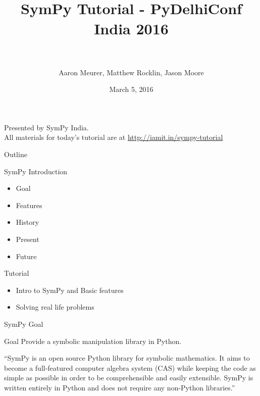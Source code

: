 \documentclass[xcolor=svgnames]{beamer}
\title[SymPy\hspace{4em}\insertframenumber/
  \inserttotalframenumber]{~\\ SymPy Tutorial - PyDelhiConf India 2016\\~}
\author[A. Meurer, Matthew Rocklin, Jason Moore]
  {Aaron Meurer, Matthew Rocklin, Jason Moore}
\institute{\pgfuseimage{mylogo}}
\date{March 5, 2016}
\begin{document}
  \begin{frame}
    \maketitle
  \begin{center}
  \normalsize Presented by SymPy India.\\ All materials for today's tutorial are at \url{http://iamit.in/sympy-tutorial}
  \end{center}
  \end{frame}
  
  \begin{frame}{Outline}
    \begin{block}{SymPy Introduction}
      \begin{itemize}
      \item Goal
      \item Features
      \item History
      \item Present
      \item Future
      \end{itemize}
    \end{block}

    \begin{block}{Tutorial}
      \begin{itemize}
      \item Intro to SymPy and Basic features
      \item Solving real life problems
      \end{itemize}
    \end{block}
  \end{frame}

  \begin{frame}{SymPy Goal}
    \begin{block}{Goal}
      Provide a symbolic manipulation library in Python.
    \end{block}
    \begin{block}

      ``SymPy is an open source Python library for symbolic mathematics. It aims to
      become a full-featured computer algebra system (CAS) while keeping the code as
      simple as possible in order to be comprehensible and easily extensible. SymPy
      is written entirely in Python and does not require any non-Python libraries.''

    \end{block}
  \end{frame}
\end{document}
